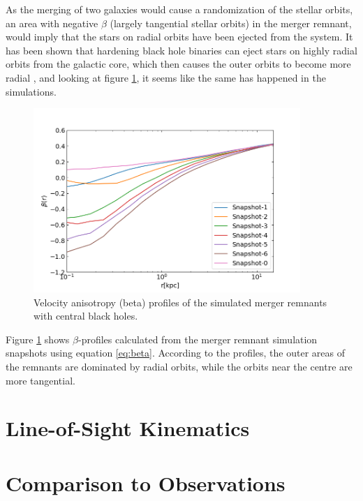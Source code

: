 \documentclass[english, oneside]{HYgradu}
\begin{document}
As the merging of two galaxies would cause a randomization of the stellar orbits, an area with negative $\beta$ (largely tangential stellar orbits) in the merger remnant, would imply that the stars on radial orbits have been ejected from the system. It has been shown that hardening black hole binaries can eject stars on highly radial orbits from the galactic core, which then causes the outer orbits to become more radial \citep{Quinlan1997, Milosavljevic2001, Thomas2014}, and looking at figure \ref{figure:beta_no_rb}, it seems like the same has happened in the simulations.

\begin{figure}[h]
	\centering
	\includegraphics[width=0.9\textwidth]{beta_no_rb.png}
	\caption{Velocity anisotropy (beta) profiles of the simulated merger remnants with central black holes.}
	\label{figure:beta_no_rb}
\end{figure}

Figure \ref{figure:beta_no_rb} shows $\beta$-profiles calculated from the merger remnant simulation snapshots using equation \ref{eq:beta}. According to the profiles, the outer areas of the remnants are dominated by radial orbits, while the orbits near the centre are more tangential.




\section{Line-of-Sight Kinematics}

\section{Comparison to Observations}
\end{document}
